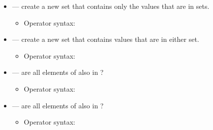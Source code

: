 \documentclass[letterpaper,10pt,english]{sphinxmanual}
\begin{document}
\begin{itemize}
\begin{itemize}
\begin{itemize}
\end{itemize}

\begin{sphinxVerbatim}[commandchars=\\\{\}]
  
\end{sphinxVerbatim}

\item {} 
 — create a new set that contains only the
values that are in  sets.
\begin{itemize}
\item {} 
Operator syntax:

\end{itemize}

\begin{sphinxVerbatim}[commandchars=\\\{\}]
  
\end{sphinxVerbatim}

\item {} 
 — create a new set that contains values that are
in either set.
\begin{itemize}
\item {} 
Operator syntax:

\end{itemize}

\begin{sphinxVerbatim}[commandchars=\\\{\}]
  
\end{sphinxVerbatim}

\item {} 
 — are all elements of  also in ?
\begin{itemize}
\item {} 
Operator syntax:

\end{itemize}

\begin{sphinxVerbatim}[commandchars=\\\{\}]
  
\end{sphinxVerbatim}

\item {} 
 — are all elements of  also in ?
\begin{itemize}
\item {} 
Operator syntax:


\end{itemize}
\end{itemize}
\end{itemize}
\end{document}
